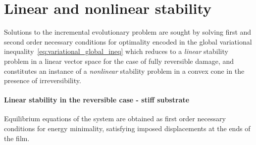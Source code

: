 \documentclass[10pt]{article}
\begin{document}
%
%

%


%

\section{Linear and nonlinear stability}
\label{sec:stability}

Solutions to the incremental evolutionary problem are sought by solving first and second order necessary conditions for optimality encoded in the global variational inequality~\eqref{eq:variational_global_ineq} which reduces to a \emph{linear} stability problem in a linear vector space for the case of fully reversible damage, and constitutes an instance of a \emph{nonlinear} stability problem in a convex cone in the presence of irreversibility.

\paragraph{Linear stability in the reversible case - stiff substrate}

%
%
%


%

Equilibrium equations of the system are obtained as first order necessary conditions for energy minimality, satisfying imposed displacements at the ends of the film.
\end{document}
